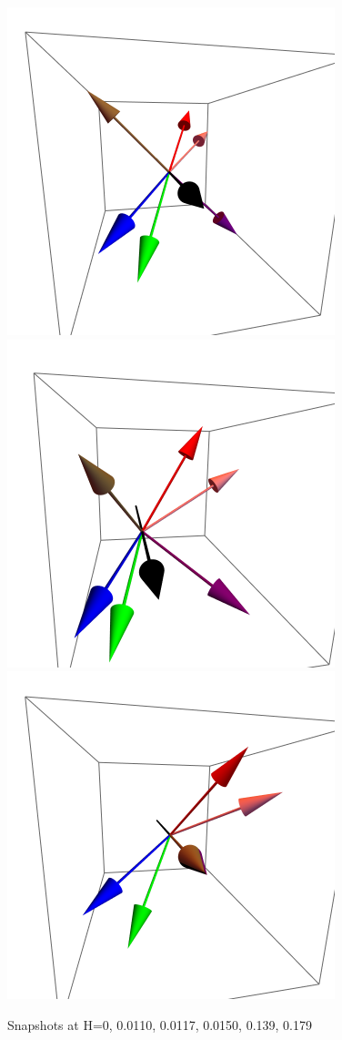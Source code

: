 \documentclass{article}
\begin{document}
\begin{figure}[ht]
\includegraphics[scale=0.3]{HVariedData/Pictures/010Inc151.png}
\includegraphics[scale=0.3]{HVariedData/Pictures/010Inc32S.png}
\includegraphics[scale=0.3]{HVariedData/Pictures/010Inc33S.png}
\caption{Snapshots at H=0, 0.0110, 0.0117, 0.0150, 0.139, 0.179 }
\end{figure}
\end{document}
